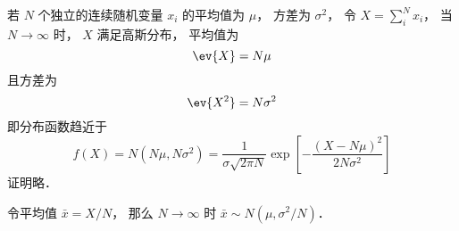 
\begin{issues}
\issueDraft
\end{issues}


若 $N$ 个独立的连续随机变量 $x_i$ 的平均值为 $\mu$， 方差为 $\sigma^2$， 令 $X = \sum_i^N x_i$， 当 $N \to \infty$ 时， $X$ 满足高斯分布， 平均值为
\begin{equation}
\ev{X} = N\mu
\end{equation}
且方差为
\begin{equation}
\ev{X^2} = N\sigma^2
\end{equation}
即分布函数趋近于
\begin{equation}
f(X) = N(N\mu, N\sigma^2) = \frac{1}{\sigma\sqrt{2\pi N}} \exp[-\frac{(X-N\mu)^2}{2N\sigma^2}]
\end{equation}
证明略．

令平均值 $\bar x = X/N$， 那么 $N\to\infty$ 时 $\bar x\sim N(\mu, \sigma^2/N)$．
